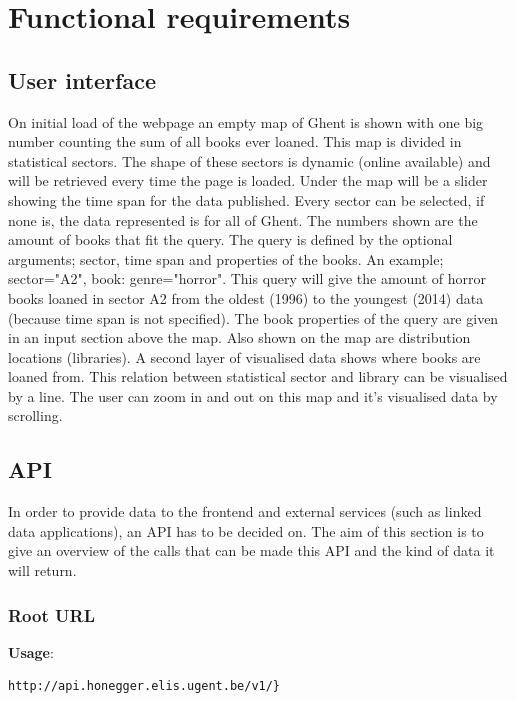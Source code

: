 \section{Functional requirements}

\subsection{User interface}

On initial load of the webpage an empty map of Ghent is shown with one big number counting the sum of all books ever loaned. This map is divided in statistical sectors. The shape of these sectors is dynamic (online available) and will be retrieved every time the page is loaded. Under the map will be a slider showing the time span for the data published. Every sector can be selected, if none is, the data represented is for all of Ghent.  The numbers shown are the amount of books that fit the query. The query is defined by the optional arguments; sector, time span and properties of the books. An example; sector="A2", book: genre="horror". This query will give the amount of horror books loaned in sector A2 from the oldest (1996) to the youngest (2014) data (because time span is not specified). The book properties of the query are given in an input section above the map. Also shown on the map are distribution locations (libraries). A second layer of visualised data shows where books are loaned from. This relation between statistical sector and library can be visualised by a line. The user can zoom in and out on this map and it's visualised data by scrolling.

\subsection{API}

In order to provide data to the frontend and external services (such as linked data applications), an API has to be decided on. The aim of this section is to give an overview of the calls that can be made this API and the kind of data it will return.

\subsubsection{Root URL}

{\bf Usage}:
\begin{verbatim}
http://api.honegger.elis.ugent.be/v1/}
\end{verbatim}


